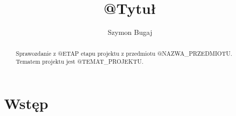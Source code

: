 \documentclass[fleqn]{article}
\begin{document}
\title{@Tytuł}
\author{Szymon Bugaj}

\maketitle

\begin{abstract}
Sprawozdanie z @ETAP etapu projektu z przedmiotu @NAZWA_PRZEDMIOTU.
Tematem projektu jest @TEMAT_PROJEKTU.
\end{abstract}

\tableofcontents



\section{Wstęp}



\end{document}
